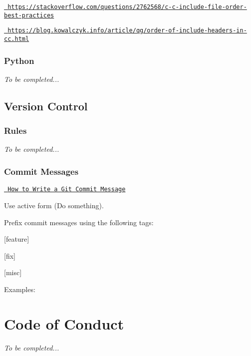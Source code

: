 \begin{DoxyItemize}
\item \href{https://stackoverflow.com/questions/2762568/c-c-include-file-order-best-practices}{\texttt{ https\+://stackoverflow.\+com/questions/2762568/c-\/c-\/include-\/file-\/order-\/best-\/practices}}
\item \href{https://blog.kowalczyk.info/article/qg/order-of-include-headers-in-cc.html}{\texttt{ https\+://blog.\+kowalczyk.\+info/article/qg/order-\/of-\/include-\/headers-\/in-\/cc.\+html}}
\end{DoxyItemize}\hypertarget{md__c_o_n_t_r_i_b_u_t_i_n_g_Python}{}\subsubsection{Python}\label{md__c_o_n_t_r_i_b_u_t_i_n_g_Python}
{\itshape To be completed...}\hypertarget{md__c_o_n_t_r_i_b_u_t_i_n_g_Version}{}\subsection{Version Control}\label{md__c_o_n_t_r_i_b_u_t_i_n_g_Version}
\hypertarget{md__c_o_n_t_r_i_b_u_t_i_n_g_Rules}{}\subsubsection{Rules}\label{md__c_o_n_t_r_i_b_u_t_i_n_g_Rules}
{\itshape To be completed...}\hypertarget{md__c_o_n_t_r_i_b_u_t_i_n_g_Commit}{}\subsubsection{Commit Messages}\label{md__c_o_n_t_r_i_b_u_t_i_n_g_Commit}
\href{https://chris.beams.io/posts/git-commit/}{\texttt{ How to Write a Git Commit Message}}

Use active form ({\ttfamily Do something}).

Prefix commit messages using the following tags\+:


\begin{DoxyItemize}
\item \mbox{[}feature\mbox{]}
\item \mbox{[}fix\mbox{]}
\item \mbox{[}misc\mbox{]}
\end{DoxyItemize}

Examples\+:


\begin{DoxyCode}{0}
\end{DoxyCode}



\begin{DoxyCode}{0}
\end{DoxyCode}
\hypertarget{md__c_o_n_t_r_i_b_u_t_i_n_g_CodeOfConduct}{}\section{Code of Conduct}\label{md__c_o_n_t_r_i_b_u_t_i_n_g_CodeOfConduct}
{\itshape To be completed...} 